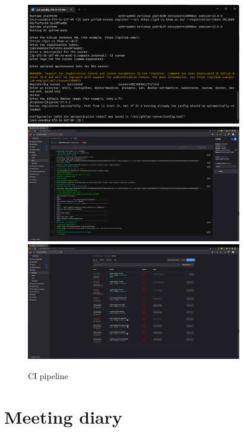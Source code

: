 \documentclass[a4paper]{article}
\begin{document}
{\begin{figure}[H] %
	\centering %
	\includegraphics[width=0.84\textwidth]{./images/pipeline_install_gitlab_runner.png}
	\includegraphics[width=0.84\textwidth]{./images/pipeline_work.png}
	\includegraphics[width=0.84\textwidth]{./images/pipeline_success.png} %
	\caption*{CI pipeline} %
	\label{Fig.main2} %
\end{figure}

\newpage

\section{Meeting diary}

}
\end{document}
